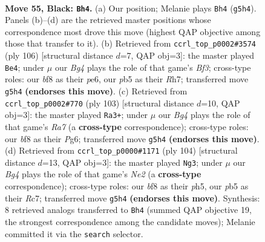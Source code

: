 \documentclass[11pt]{article}
\begin{document}
\clearpage

\begin{figure}[p]\centering
\begin{subfigure}{0.46\textwidth}\centering
\resizebox{\linewidth}{!}{%
\newchessgame
\chessboard[
  setfen={5B2/R7/P7/1P3kb1/3K4/8/8/8 b - - 0 55},
  showmover=false,
  pgfstyle=straightmove, color=movearrow, markmove={g5-h4}
]}
\caption{}
\end{subfigure}\hfill
\begin{subfigure}{0.46\textwidth}\centering
\resizebox{\linewidth}{!}{%
\newchessgame
\chessboard[
  setfen={5k2/7R/4p1p1/6r1/8/5B2/5K2/8 w - - 0 54},
  showmover=false,
  pgfstyle=straightmove, color=movearrow, markmove={f3-e4}
]}
\caption{}
\end{subfigure}
\\[4pt]
\begin{subfigure}{0.46\textwidth}\centering
\resizebox{\linewidth}{!}{%
\newchessgame
\chessboard[
  setfen={8/7R/6pP/4k1P1/8/3K4/r7/8 b - - 0 52},
  showmover=false,
  pgfstyle=straightmove, color=movearrow, markmove={a2-a3}
]}
\caption{}
\end{subfigure}\hfill
\begin{subfigure}{0.46\textwidth}\centering
\resizebox{\linewidth}{!}{%
\newchessgame
\chessboard[
  setfen={6k1/2R5/8/1p5p/1r6/4K3/4N3/8 w - - 1 53},
  showmover=false,
  pgfstyle=straightmove, color=movearrow, markmove={e2-g3}
]}
\caption{}
\end{subfigure}
\caption{\textbf{Move 55, Black: \texttt{Bh4}.} (a) Our position; Melanie plays \texttt{Bh4} (\texttt{g5h4}). Panels (b)--(d) are the retrieved master positions whose correspondence most drove this move (highest QAP objective among those that transfer to it). (b) Retrieved from \texttt{ccrl\_top\_p0002\#3574} (ply 106) [structural distance $d$=7, QAP obj=3]: the master played \texttt{Be4}; under $\mu$ our \emph{Bg4} plays the role of that game's \emph{Bf3}; cross-type roles: our \emph{b}f8 as their \emph{p}e6, our \emph{p}b5 as their \emph{R}h7; transferred move \texttt{g5h4} \textbf{(endorses this move)}. (c) Retrieved from \texttt{ccrl\_top\_p0002\#770} (ply 103) [structural distance $d$=10, QAP obj=3]: the master played \texttt{Ra3+}; under $\mu$ our \emph{Bg4} plays the role of that game's \emph{Ra7} (a \textbf{cross-type} correspondence); cross-type roles: our \emph{b}f8 as their \emph{P}g6; transferred move \texttt{g5h4} \textbf{(endorses this move)}. (d) Retrieved from \texttt{ccrl\_top\_p0000\#1171} (ply 104) [structural distance $d$=13, QAP obj=3]: the master played \texttt{Ng3}; under $\mu$ our \emph{Bg4} plays the role of that game's \emph{Ne2} (a \textbf{cross-type} correspondence); cross-type roles: our \emph{b}f8 as their \emph{p}h5, our \emph{p}b5 as their \emph{R}c7; transferred move \texttt{g5h4} \textbf{(endorses this move)}. Synthesis: 8 retrieved analogs transferred to \texttt{Bh4} (summed QAP objective 19, the strongest correspondence among the candidate moves); Melanie committed it via the \texttt{search} selector.}
\label{fig:thought-m109}
\end{figure}
\end{document}

